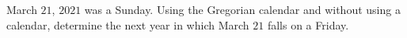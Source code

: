 March $21$, $2021$ was a Sunday. Using the Gregorian calendar and without using a calendar, determine the next year in which March $21$ falls on a Friday.
